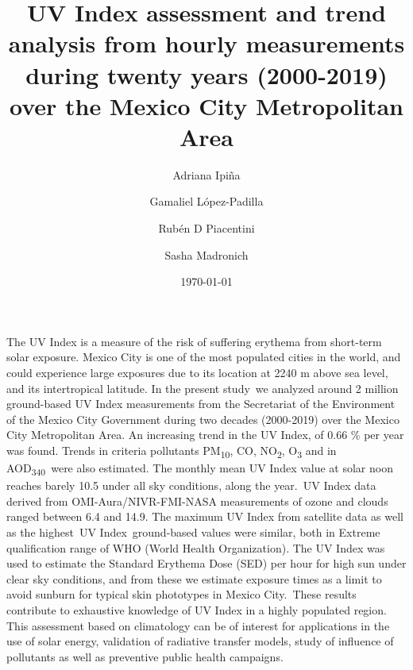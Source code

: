 \documentclass[10pt]{article}
\renewenvironment{abstract}
  {{\bfseries\noindent{\abstractname}\par\nobreak}\footnotesize}
  {\bigskip}
\begin{document}
\title{UV Index assessment and trend analysis from hourly 
measurements during twenty years (2000-2019) over the Mexico City Metropolitan Area}


\author[1]{Adriana Ipiña}%
\author[2]{Gamaliel López-Padilla}%
\author[1]{Rubén D Piacentini}%
\author[3]{Sasha Madronich}
%
%


\vspace{-1em}



  \date{\today}


\begingroup
\let\center\flushleft
\let\endcenter\endflushleft
\maketitle
\endgroup





\begin{abstract}
The UV Index is a measure of the risk of suffering erythema from
short-term solar exposure. Mexico City is one of the most populated
cities in the world, and could experience large exposures due to its
location at 2240 m above sea level, and its intertropical latitude. In
the present study~we analyzed around 2 million ground-based UV Index
measurements from the Secretariat of the Environment of the Mexico City
Government during two decades (2000-2019) over the Mexico City
Metropolitan Area. An increasing trend in the UV Index, of 0.66 \% per
year was found. Trends in criteria pollutants PM\textsubscript{10}, CO,
NO\textsubscript{2}, O\textsubscript{3} and in
AOD\textsubscript{340}~were also estimated. The monthly mean UV Index
value at solar noon reaches barely 10.5 under all sky conditions, along
the year.~UV Index data derived from OMI-Aura/NIVR-FMI-NASA measurements
of ozone and clouds ranged between 6.4 and 14.9. The maximum UV Index
from satellite data as well as the highest~UV Index~ground-based values
were similar, both in Extreme qualification range of WHO (World Health
Organization). The UV Index was used to estimate the Standard Erythema
Dose (SED) per hour for high sun under clear sky conditions, and from
these we estimate exposure times as a limit to avoid sunburn for typical
skin phototypes in Mexico City.~These results contribute to exhaustive
knowledge of UV Index in a highly populated region. This assessment
based on climatology can be of interest for applications in the use of
solar energy, validation of radiative transfer models, study of
influence of pollutants as well as preventive public health campaigns.%
\end{abstract}%
\end{document}
